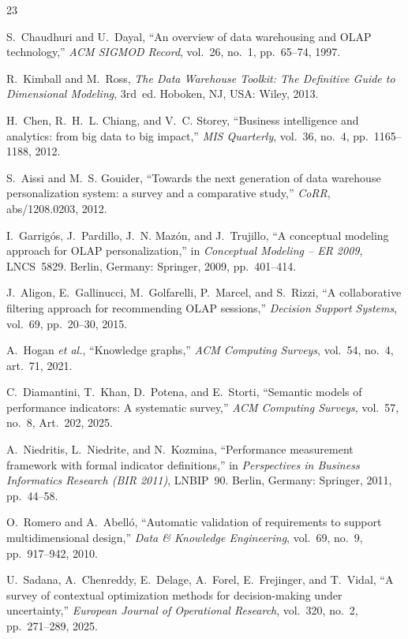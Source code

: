 \documentclass[journal]{IEEEtran}
\begin{document}
\begin{thebibliography}{23}

S.~Chaudhuri and U.~Dayal, ``An overview of data warehousing and OLAP technology,'' \emph{ACM SIGMOD Record}, vol.~26, no.~1, pp.~65--74, 1997.

R.~Kimball and M.~Ross, \emph{The Data Warehouse Toolkit: The Definitive Guide to Dimensional Modeling}, 3rd~ed. Hoboken, NJ, USA: Wiley, 2013.

H.~Chen, R.~H.~L. Chiang, and V.~C. Storey, ``Business intelligence and analytics: from big data to big impact,'' \emph{MIS Quarterly}, vol.~36, no.~4, pp.~1165--1188, 2012.

S.~Aissi and M.~S. Gouider, ``Towards the next generation of data warehouse personalization system: a survey and a comparative study,'' \emph{CoRR}, abs/1208.0203, 2012.

I.~Garrig\'os, J.~Pardillo, J.~N. Maz\'on, and J.~Trujillo, ``A conceptual modeling approach for OLAP personalization,'' in \emph{Conceptual Modeling -- ER 2009}, LNCS~5829. Berlin, Germany: Springer, 2009, pp.~401--414.

J.~Aligon, E.~Gallinucci, M.~Golfarelli, P.~Marcel, and S.~Rizzi, ``A collaborative filtering approach for recommending OLAP sessions,'' \emph{Decision Support Systems}, vol.~69, pp.~20--30, 2015.

A.~Hogan \emph{et al.}, ``Knowledge graphs,'' \emph{ACM Computing Surveys}, vol.~54, no.~4, art.~71, 2021.

C.~Diamantini, T.~Khan, D.~Potena, and E.~Storti, ``Semantic models of performance indicators: A systematic survey,'' \emph{ACM Computing Surveys}, vol.~57, no.~8, Art.~202, 2025.

A.~Niedritis, L.~Niedrite, and N.~Kozmina, ``Performance measurement framework with formal indicator definitions,'' in \emph{Perspectives in Business Informatics Research (BIR 2011)}, LNBIP~90. Berlin, Germany: Springer, 2011, pp.~44--58.

O.~Romero and A.~Abell\'o, ``Automatic validation of requirements to support multidimensional design,'' \emph{Data \& Knowledge Engineering}, vol.~69, no.~9, pp.~917--942, 2010.

U.~Sadana, A.~Chenreddy, E.~Delage, A.~Forel, E.~Frejinger, and T.~Vidal, ``A survey of contextual optimization methods for decision-making under uncertainty,'' \emph{European Journal of Operational Research}, vol.~320, no.~2, pp.~271--289, 2025.


\end{thebibliography}
\end{document}
